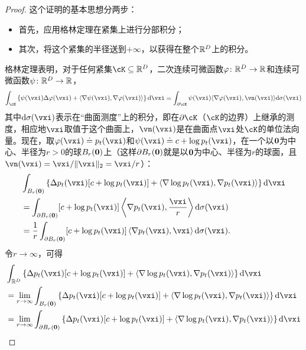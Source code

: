 \documentclass[../../book-main_zh.tex]{subfiles}
\begin{document}
\begin{proof}
    这个证明的基本思想分两步：
    \begin{itemize}
        \item 首先，应用格林定理在紧集上进行分部积分；
        \item 其次，将这个紧集的半径送到\(+\infty\)，以获得在整个\(\mathbb{R}^{D}\)上的积分。
    \end{itemize}
    格林定理表明，对于任何紧集\(\cK \subseteq \R^{D}\)，二次连续可微函数\(\plainphi \colon \R^{D} \to \R\)和连续可微函数\(\psi \colon \mathbb{R}^{D} \to \mathbb{R}\)，
    \begin{equation}
        \int_{\cK}\bc{\psi(\vxi) \Delta \plainphi(\vxi) + \ip{\nabla \psi(\vxi)}{\nabla \plainphi(\vxi)}}\odif{\vxi} = \int_{\partial \cK}\psi(\vxi)\ip{\nabla \plainphi(\vxi)}{\vn(\vxi)}\odif{\sigma(\vxi)}
    \end{equation}
    其中\(\odif{\sigma(\vxi)}\)表示在“曲面测度”上的积分，即在\(\partial \cK\)（\(\cK\)的边界）上继承的测度，相应地\(\vxi\)取值于这个曲面上，\(\vn(\vxi)\)是在曲面点\(\vxi\)处\(\cK\)的单位法向量。现在，取\(\plainphi(\vxi) \doteq p_{t}(\vxi)\)和\(\psi(\vxi) \doteq c + \log p_{t}(\vxi)\)，在一个以\(\bm{0}\)为中心、半径为\(r > 0\)的球\(B_{r}(\bm{0})\)上（这样\(\partial B_{r}(\bm{0})\)就是以\(\bm{0}\)为中心、半径为\(r\)的球面，且\(\vn(\vxi) = \vxi/\norm{\vxi}_{2} = \vxi/r\)）：
    \begin{align}
        &\int_{B_{r}(\vzero)}\bc{\Delta p_{t}(\vxi)[c + \log p_{t}(\vxi)] + \ip{\nabla \log p_{t}(\vxi)}{\nabla p_{t}(\vxi)}}\odif{\vxi} \\
        &= \int_{\partial B_{r}(\vzero)}[c + \log p_{t}(\vxi)]\ip*{\nabla p_{t}(\vxi)}{\frac{\vxi}{r}}\odif{\sigma(\vxi)} \\
        &= \frac{1}{r}\int_{\partial B_{r}(\vzero)}[c + \log p_{t}(\vxi)]\ip*{\nabla p_{t}(\vxi)}{\vxi}\odif{\sigma(\vxi)}.
    \end{align}
    令\(r \to \infty\)，可得
    \begin{align}
        &\int_{\R^{D}}\bc{\Delta p_{t}(\vxi)[c + \log p_{t}(\vxi)] + \ip{\nabla \log p_{t}(\vxi)}{\nabla p_{t}(\vxi)}}\odif{\vxi} \label{eq:app_diffusion_r_infinity_limit} \\
        &= \lim_{r \to \infty}\int_{B_{r}(\vzero)}\bc{\Delta p_{t}(\vxi)[c + \log p_{t}(\vxi)] + \ip{\nabla \log p_{t}(\vxi)}{\nabla p_{t}(\vxi)}}\odif{\vxi} \\
        &= \lim_{r \to \infty}\int_{\partial B_{r}(\vzero)}\bc{\Delta p_{t}(\vxi)[c + \log p_{t}(\vxi)] + \ip{\nabla \log p_{t}(\vxi)}{\nabla p_{t}(\vxi)}}\odif{\vxi} \\ 

\end{align}
\end{proof}
\end{document}
